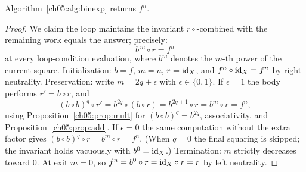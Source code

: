 \begin{proposition}
\label{ch05:prop:binexpcorrect}
Algorithm~\ref{ch05:alg:binexp} returns $f^{n}$.
\end{proposition}

\begin{proof}
We claim the loop maintains the invariant $r \circ$-combined with the
remaining work equals the answer; precisely:
\[
  b^{\,m} \circ r = f^{n}
\]
at every loop-condition evaluation, where $b^{m}$ denotes the $m$-th power
of the current square. Initialization: $b = f$, $m = n$, $r = \mathrm{id}_X$, and
$f^{n} \circ \mathrm{id}_X = f^{n}$ by right neutrality. Preservation: write
$m = 2q + \epsilon$ with $\epsilon \in \{0, 1\}$. If $\epsilon = 1$ the
body performs $r' = b \circ r$, and
\[
  (b \circ b)^{q} \circ r'
  = b^{2q} \circ (b \circ r)
  = b^{2q + 1} \circ r
  = b^{m} \circ r = f^{n},
\]
using Proposition~\ref{ch05:prop:mult} for $(b \circ b)^{q} = b^{2q}$,
associativity, and Proposition~\ref{ch05:prop:add}. If $\epsilon = 0$ the
same computation without the extra factor gives
$(b \circ b)^{q} \circ r = b^{m} \circ r = f^{n}$. (When $q = 0$ the
final squaring is skipped; the invariant holds vacuously with $b^{0} =
\mathrm{id}_X$.) Termination: $m$ strictly decreases toward $0$. At exit $m = 0$,
so $f^{n} = b^{0} \circ r = \mathrm{id}_X \circ r = r$ by left neutrality.
\end{proof}

